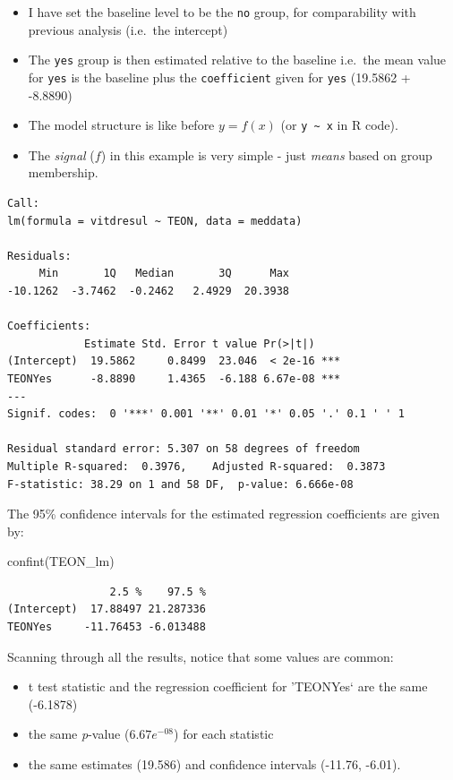 \documentclass[
  oneside]{krantz}
\newenvironment{Shaded}{\begin{snugshade}}{\end{snugshade}}
\newcommand{\FunctionTok}[1]{\textcolor[rgb]{0.00,0.00,0.00}{#1}}
\newcommand{\NormalTok}[1]{#1}
\providecommand{\tightlist}{%
  \setlength{\itemsep}{0pt}\setlength{\parskip}{0pt}}
\begin{document}
\begin{itemize}
\tightlist
\item
  I have set the baseline level to be the \texttt{no} group, for comparability with previous analysis (i.e.~the intercept)
\item
  The \texttt{yes} group is then estimated relative to the baseline i.e.~the mean value for \texttt{yes} is the baseline plus the \texttt{coefficient} given for \texttt{yes} (19.5862 + -8.8890)
\item
  The model structure is like before \(y=f(x)\) (or \texttt{y\ \textasciitilde{}\ x} in R code).
\item
  The \emph{signal} (\(f\)) in this example is very simple - just \emph{means} based on group membership.
\end{itemize}

\begin{verbatim}
Call:
lm(formula = vitdresul ~ TEON, data = meddata)

Residuals:
     Min       1Q   Median       3Q      Max 
-10.1262  -3.7462  -0.2462   2.4929  20.3938 

Coefficients:
            Estimate Std. Error t value Pr(>|t|)    
(Intercept)  19.5862     0.8499  23.046  < 2e-16 ***
TEONYes      -8.8890     1.4365  -6.188 6.67e-08 ***
---
Signif. codes:  0 '***' 0.001 '**' 0.01 '*' 0.05 '.' 0.1 ' ' 1

Residual standard error: 5.307 on 58 degrees of freedom
Multiple R-squared:  0.3976,    Adjusted R-squared:  0.3873 
F-statistic: 38.29 on 1 and 58 DF,  p-value: 6.666e-08
\end{verbatim}

The 95\% confidence intervals for the estimated regression coefficients are given by:

\begin{Shaded}
\begin{Highlighting}[]
\FunctionTok{confint}\NormalTok{(TEON\_lm)}
\end{Highlighting}
\end{Shaded}

\begin{verbatim}
                2.5 %    97.5 %
(Intercept)  17.88497 21.287336
TEONYes     -11.76453 -6.013488
\end{verbatim}

Scanning through all the results, notice that some values are common:

\begin{itemize}
\tightlist
\item
  t test statistic and the regression coefficient for 'TEONYes` are the same (-6.1878)
\item
  the same \emph{p}-value (\(6.67e^{-08}\)) for each statistic
\item
  the same estimates (19.586) and confidence intervals (-11.76, -6.01).
\end{itemize}
\end{document}
